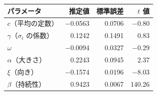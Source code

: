 \begin{tabular}{lrrr}
\toprule
パラメータ & 推定値 & 標準誤差 & $t$ 値 \\
\midrule
$c$（平均の定数） & \ensuremath{-}0.0563 & 0.0706 & \ensuremath{-}0.80 \\
$\gamma$（$\sigma_t$ の係数） & 0.1242 & 0.1491 & 0.83 \\
$\omega$ & \ensuremath{-}0.0094 & 0.0327 & \ensuremath{-}0.29 \\
$\alpha$（大きさ） & 0.2243 & 0.0945 & 2.37 \\
$\xi$（向き） & \ensuremath{-}0.1574 & 0.0196 & \ensuremath{-}8.03 \\
$\beta$（持続性） & 0.9423 & 0.0067 & 140.26 \\
\bottomrule
\end{tabular}
